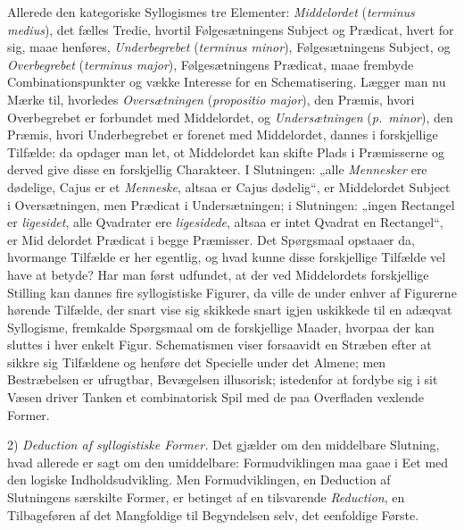 \documentclass[12pt]{book}
\newcommand{\opage}[1]{\marginnote{\footnotesize\textit{[#1]}}}
\begin{document}
Allerede den kategoriske Syllogismes tre Elementer: \emph{Middelordet} (\textit{terminus medius}), det fælles Tredie, hvortil Følgesætningens Subject og Prædicat, hvert for sig, maae henføres, \emph{Underbegrebet} (\textit{terminus minor}), Følgesætningens Subject, og \emph{Overbegrebet} (\textit{terminus major}), Følgesætningens Prædicat, maae frembyde Combinationspunkter og vække Interesse for en Schematisering. Lægger man nu Mærke til, hvorledes \emph{Oversætningen} (\textit{propositio major}), den Præmis, hvori Overbegrebet er forbundet med Middelordet, og \emph{Undersætningen} (\textit{p.\ minor}), den Præmis, hvori Underbegrebet er forenet med Middelordet, dannes i forskjellige Tilfælde: da opdager man let, ot Middelordet kan skifte Plads i Præmisserne og derved give disse en forskjellig Charakteer. %
I Slutningen: „alle \emph{Mennesker} ere dødelige, Cajus er et \emph{Menneske}, altsaa er Cajus dødelig“, er Middelordet Subject i Oversætningen, men Prædicat i Undersætningen; i Slutningen: „ingen Rectangel er \emph{ligesidet}, alle Qvadrater ere \emph{ligesidede}, altsaa er intet Qvadrat en Rectangel“, er Mid%
\opage{319}delordet Prædicat i begge Præmisser. Det Spørgsmaal opstaaer da, hvormange Tilfælde er her egentlig, og hvad kunne disse forskjellige Tilfælde vel have at betyde? Har man først udfundet, at der ved Middelordets forskjellige Stilling kan dannes fire syllogistiske Figurer, da ville de under enhver af Figurerne hørende Tilfælde, der snart vise sig skikkede snart igjen uskikkede til en adæqvat Syllogisme, fremkalde Spørgsmaal om de forskjellige Maader, hvorpaa der kan sluttes i hver enkelt Figur. Schematismen viser forsaavidt en Stræben efter at sikkre sig Tilfældene og henføre det Specielle under det Almene; men Bestræbelsen er ufrugtbar, Bevægelsen illusorisk; istedenfor at fordybe sig i sit Væsen driver Tanken et combinatorisk Spil med de paa Overfladen vexlende Former.

2) \emph{Deduction af syllogistiske Former.} Det gjælder om den middelbare Slutning, hvad allerede er sagt om den umiddelbare: Formudviklingen maa gaae i Eet med den logiske Indholdsudvikling. Men Formudviklingen, en Deduction af Slutningens særskilte Former, er betinget af en tilsvarende \emph{Reduction}, en Tilbageføren af det Mangfoldige til Begyndelsen selv, det eenfoldige Første.
\end{document}
